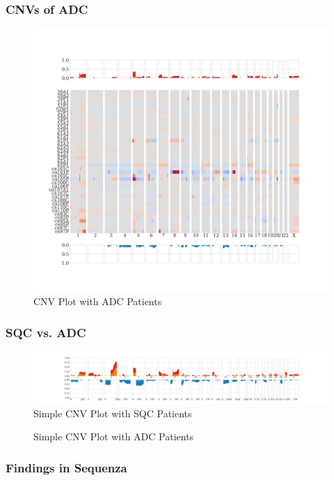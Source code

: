\documentclass{beamer}
\begin{document}
    \begin{frame}
        \frametitle{CNVs of ADC}

        \begin{figure}
            \includegraphics[height=0.7 \textheight]{figures/Sequenza/BWA-genome-ADC.pdf}
            \caption{CNV Plot with ADC Patients}
        \end{figure}
    \end{frame}

    \begin{frame}
        \frametitle{SQC vs. ADC}

        \begin{figure}
            \includegraphics[width=\linewidth]{figures/Sequenza/BWA-simple-SQC.pdf}
            \caption{Simple CNV Plot with SQC Patients}
        \end{figure}

        \begin{figure}
            \caption{Simple CNV Plot with ADC Patients}
        \end{figure}
    \end{frame}

    \begin{frame}
        \frametitle{Findings in Sequenza}
    \end{frame}
\end{document}
